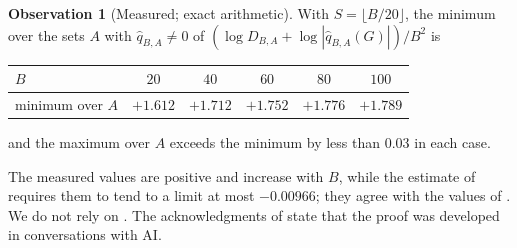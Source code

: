 \documentclass[11pt]{article}
\theoremstyle{definition}
\newtheorem{observation}[theorem]{Observation}
\begin{document}
\begin{observation}[Measured; exact arithmetic]\label{obs:sun}
With $S=\lfloor B/20\rfloor$, the minimum over the sets $A$ with $\hat q_{B,A}\ne0$ of $(\log D_{B,A}+\log|\hat q_{B,A}(G)|)/B^2$ is
\begin{center}
\small
\begin{tabular}{lccccc}
\toprule
$B$ & $20$ & $40$ & $60$ & $80$ & $100$\\
\midrule
minimum over $A$ & $+1.612$ & $+1.712$ & $+1.752$ & $+1.776$ & $+1.789$\\
\bottomrule
\end{tabular}
\end{center}
and the maximum over $A$ exceeds the minimum by less than $0.03$ in each case.
\end{observation}

The measured values are positive and increase with $B$, while the estimate of \cite[Theorem~9.1]{Sun} requires them to tend to a limit at most $-0.00966$; they agree with the values of \cite{Wachs}. We do not rely on \cite{Sun}. The acknowledgments of \cite{Sun} state that the proof was developed in conversations with AI.
\end{document}
